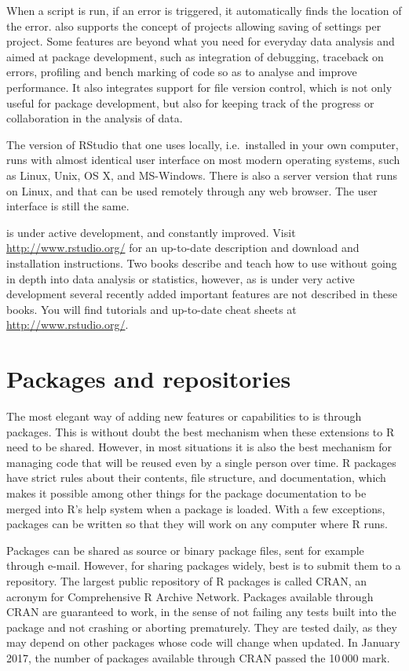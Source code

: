 \documentclass[krantz2,ChapterTOCs]{krantz}\usepackage{knitr}
\begin{document}
When a script is run, if an error is triggered, it automatically finds the location of the error. \RStudio also supports the concept of projects allowing saving of settings per project. Some features are beyond what you need for everyday data analysis and aimed at package development, such as integration of debugging, traceback on errors, profiling and bench marking of code so as to analyse and improve performance. It also integrates support for file version control, which is not only useful for package development, but also for keeping track of the progress or collaboration in the analysis of data.

The version of RStudio that one uses locally, i.e.\ installed in your own computer, runs with almost identical user interface on most modern operating systems, such as Linux, Unix, OS X, and MS-Windows. There is also a server version that runs on Linux, and that can be used remotely through any web browser. The user interface is still the same.

\RStudio is under active development, and constantly improved. Visit \url{http://www.rstudio.org/} for an up-to-date description and download and installation instructions. Two books \autocite{vanderLoo2012,Hillebrand2015} describe and teach how to use \RStudio without going in depth into data analysis or statistics, however, as \RStudio is under very active development several recently added important features are not described in these books. You will find tutorials and up-to-date cheat sheets at \url{http://www.rstudio.org/}.

\section{Packages and repositories}

The most elegant way of adding new features or capabilities to \Rlang is through packages. This is without doubt the best mechanism when these extensions to R need to be shared. However, in most situations it is also the best mechanism for managing code that will be reused even by a single person over time. R packages have strict rules about their contents, file structure, and documentation, which makes it possible among other things for the package documentation to be merged into R's help system when a package is loaded. With a few exceptions, packages can be written so that they will work on any computer where R runs.

Packages can be shared as source or binary package files, sent for example through e-mail. However, for sharing packages widely, best is to submit them to a repository. The largest public repository of R packages is called CRAN, an acronym for Comprehensive R Archive Network. Packages available through CRAN are guaranteed to work, in the sense of not failing any tests built into the package and not crashing or aborting prematurely. They are tested daily, as they may depend on other packages whose code will change when updated. In January 2017, the number of packages available through CRAN passed the 10\,000 mark.
\end{document}
